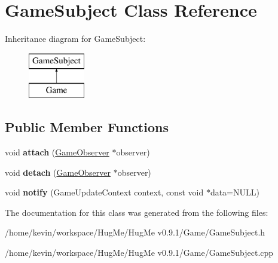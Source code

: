 \hypertarget{classGameSubject}{
\section{GameSubject Class Reference}
\label{classGameSubject}
}
Inheritance diagram for GameSubject:\begin{figure}[H]
\begin{center}
\leavevmode
\includegraphics[height=2cm]{classGameSubject}
\end{center}
\end{figure}
\subsection*{Public Member Functions}
\begin{DoxyCompactItemize}
\item 
\hypertarget{classGameSubject_ae4e572d6972070eda5c571374051494b}{
void {\bfseries attach} (\hyperlink{classGameObserver}{GameObserver} $\ast$observer)}
\label{classGameSubject_ae4e572d6972070eda5c571374051494b}

\item 
\hypertarget{classGameSubject_acd17fa692354854f29a04a61c4c3305b}{
void {\bfseries detach} (\hyperlink{classGameObserver}{GameObserver} $\ast$observer)}
\label{classGameSubject_acd17fa692354854f29a04a61c4c3305b}

\item 
\hypertarget{classGameSubject_a3768701e1c586d1c1c60132a2eeae986}{
void {\bfseries notify} (GameUpdateContext context, const void $\ast$data=NULL)}
\label{classGameSubject_a3768701e1c586d1c1c60132a2eeae986}

\end{DoxyCompactItemize}


The documentation for this class was generated from the following files:\begin{DoxyCompactItemize}
\item 
/home/kevin/workspace/HugMe/HugMe v0.9.1/Game/GameSubject.h\item 
/home/kevin/workspace/HugMe/HugMe v0.9.1/Game/GameSubject.cpp\end{DoxyCompactItemize}
